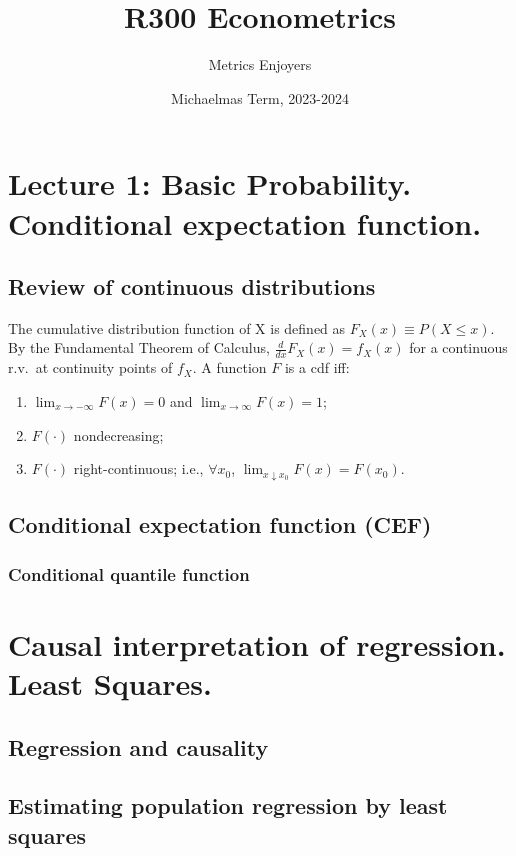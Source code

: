 \documentclass[DIV=14,titlepage=false]{scrreprt}
\title{%
R300 Econometrics}
\author{Metrics Enjoyers}
\date{Michaelmas Term, 2023-2024}
\begin{document}
\maketitle

\tableofcontents
\newpage
\chapter{Lecture 1: Basic Probability. Conditional expectation function.}
\section{Review of continuous distributions}

\begin{definition}
  The cumulative distribution function of X is  defined as $ F_X(x) \equiv P(X \leq x) $. 
  By the Fundamental Theorem of Calculus, $ \frac{d}{dx} F_X(x) = f_X(x) $ for a continuous r.v.\ at continuity points of $ f_X $. A function $ F $ is a cdf iff:
  \begin{enumerate}
  \item $ \lim_{x \to -\infty} F(x) = 0 $ and $ \lim_{x \to \infty} F(x) = 1 $;
  \item $ F (\cdot) $ nondecreasing;
  \item $ F (\cdot) $ right-continuous; i.e., $ \forall x_0 $, $ \lim_{x \downarrow x_0} F(x) = F(x_0) $.
  \end{enumerate}
\end{definition}

\section{Conditional expectation function (CEF)}
\subsection{Conditional quantile function}
\chapter{Causal interpretation of regression. Least Squares.}
\section{Regression and causality}
\section{Estimating population regression by least squares}
\end{document}
